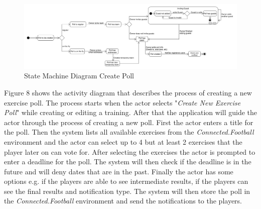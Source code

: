 \begin{figure}[H]
    \begin{center}
        \includegraphics[width=1\textwidth]{images/diagrams/state_machine_diagrams/StateDiagram_CreatePoll.png}
        \caption{State Machine Diagram Create Poll}
        \label{fig:state_machine_diagram_create_poll}
    \end{center}
\end{figure}

Figure 8 shows the activity diagram that describes the process of creating a new exercise poll. 
\newline
The process starts when the actor selects "\textit{Create New Exercise Poll}" while creating or editing a training. After that the application will guide the actor through the process of creating a new poll. First the actor enters a title for the poll. Then the system lists all available exercises from the \textit{Connected.Football} environment and the actor can select up to 4 but at least 2 exercises that the player later on can vote for. After selecting the exercises the actor is prompted to enter a deadline for the poll. The system will then check if the deadline is in the future and will deny dates that are in the past. Finally the actor has some options e.g. if the players are able to see intermediate results, if the players can see the final results and notification type. The system will then store the poll in the \textit{Connected.Football} environment and send the notifications to the players. 

